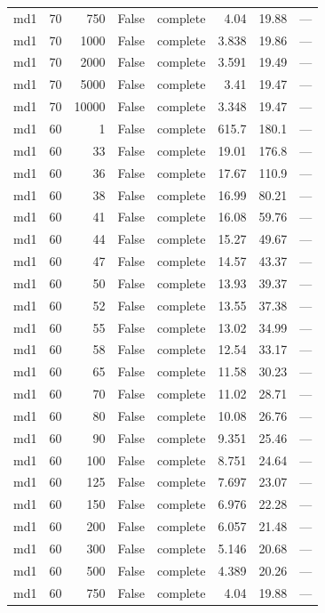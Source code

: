 \begin{tabular}{lrrrlrrl}
md1 & 70 & 750 & False & complete & 4.04 & 19.88 & — \\
md1 & 70 & 1000 & False & complete & 3.838 & 19.86 & — \\
md1 & 70 & 2000 & False & complete & 3.591 & 19.49 & — \\
md1 & 70 & 5000 & False & complete & 3.41 & 19.47 & — \\
md1 & 70 & 10000 & False & complete & 3.348 & 19.47 & — \\
md1 & 60 & 1 & False & complete & 615.7 & 180.1 & — \\
md1 & 60 & 33 & False & complete & 19.01 & 176.8 & — \\
md1 & 60 & 36 & False & complete & 17.67 & 110.9 & — \\
md1 & 60 & 38 & False & complete & 16.99 & 80.21 & — \\
md1 & 60 & 41 & False & complete & 16.08 & 59.76 & — \\
md1 & 60 & 44 & False & complete & 15.27 & 49.67 & — \\
md1 & 60 & 47 & False & complete & 14.57 & 43.37 & — \\
md1 & 60 & 50 & False & complete & 13.93 & 39.37 & — \\
md1 & 60 & 52 & False & complete & 13.55 & 37.38 & — \\
md1 & 60 & 55 & False & complete & 13.02 & 34.99 & — \\
md1 & 60 & 58 & False & complete & 12.54 & 33.17 & — \\
md1 & 60 & 65 & False & complete & 11.58 & 30.23 & — \\
md1 & 60 & 70 & False & complete & 11.02 & 28.71 & — \\
md1 & 60 & 80 & False & complete & 10.08 & 26.76 & — \\
md1 & 60 & 90 & False & complete & 9.351 & 25.46 & — \\
md1 & 60 & 100 & False & complete & 8.751 & 24.64 & — \\
md1 & 60 & 125 & False & complete & 7.697 & 23.07 & — \\
md1 & 60 & 150 & False & complete & 6.976 & 22.28 & — \\
md1 & 60 & 200 & False & complete & 6.057 & 21.48 & — \\
md1 & 60 & 300 & False & complete & 5.146 & 20.68 & — \\
md1 & 60 & 500 & False & complete & 4.389 & 20.26 & — \\
md1 & 60 & 750 & False & complete & 4.04 & 19.88 & — \\

\end{tabular}
